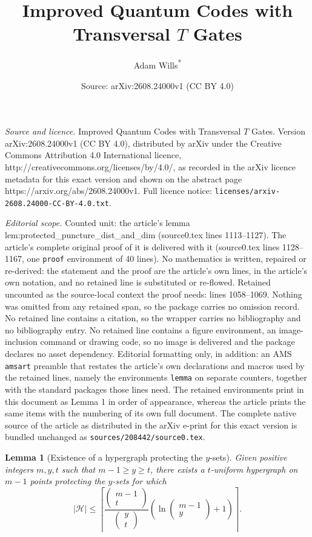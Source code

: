 \documentclass[10pt,a4paper]{amsart}
\title{Improved Quantum Codes with Transversal $T$ Gates}
\author{Adam Wills\textsuperscript{*}}
\date{Source: arXiv:2608.24000v1 (CC BY 4.0)}
\newtheorem{lemma}{Lemma}
\begin{document}
\maketitle

\noindent\emph{Source and licence.} Improved Quantum Codes with Transversal $T$ Gates. Version arXiv:2608.24000v1 (CC BY 4.0), distributed by arXiv under the Creative Commons Attribution 4.0 International licence, http://creativecommons.org/licenses/by/4.0/, as recorded in the arXiv licence metadata for this exact version and shown on the abstract page https://arxiv.org/abs/2608.24000v1. Full licence notice: \texttt{licenses/arxiv-2608.24000-CC-BY-4.0.txt}.\par\smallskip

\noindent\textit{Editorial scope.} Counted unit: the article's lemma lem:protected\_puncture\_dist\_and\_dim (source0.tex lines 1113--1127). The article's complete original proof of it is delivered with it (source0.tex lines 1128--1167, one \texttt{proof} environment of 40 lines). No mathematics is written, repaired or re-derived: the statement and the proof are the article's own lines, in the article's own notation, and no retained line is substituted or re-flowed.  Retained uncounted as the source-local context the proof needs: lines 1058--1069.  Nothing was omitted from any retained span, so the package carries no omission record.  No retained line contains a citation, so the wrapper carries no bibliography and no bibliography entry.  No retained line contains a figure environment, an image-inclusion command or drawing code, so no image is delivered and the package declares no asset dependency.  Editorial formatting only, in addition: an AMS \texttt{amsart} preamble that restates the article's own declarations and macros used by the retained lines, namely the environments \texttt{lemma} on separate counters, together with the standard packages those lines need.  The retained environments print in this document as Lemma 1 in order of appearance, whereas the article prints the same items with the numbering of its own full document.  The complete native source of the article as distributed in the arXiv e-print for this exact version is bundled unchanged as \texttt{sources/208442/source0.tex}.
\begin{lemma}[Existence of a hypergraph protecting the $y$-sets]\label{lem:hypergraph_existence}
    Given positive integers $m,y,t$ such that $m-1 \geq y \geq t$, there exists a $t$-uniform hypergraph on $m-1$ points protecting the $y$-sets for which
    \begin{equation}
        |\mathcal{H}| \leq\left\lceil\frac{\begin{pmatrix}
            m-1\\t
        \end{pmatrix}}{\begin{pmatrix}
            y\\t
        \end{pmatrix}}\left(\ln\begin{pmatrix}
            m-1\\y
        \end{pmatrix}+1\right)\right\rceil.
    \end{equation}
\end{lemma}
\end{document}
